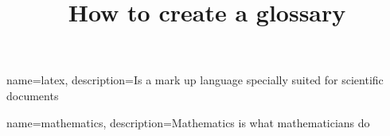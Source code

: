 \usepackage[acronym,noredefwarn]{glossaries}
\makenoidxglossaries

{
    name=latex,
    description={Is a mark up language specially suited 
    for scientific documents}
}
 
{
    name=mathematics,
    description={Mathematics is what mathematicians do}
}

 
 
\title{How to create a glossary}
\author{ }
\date{ }